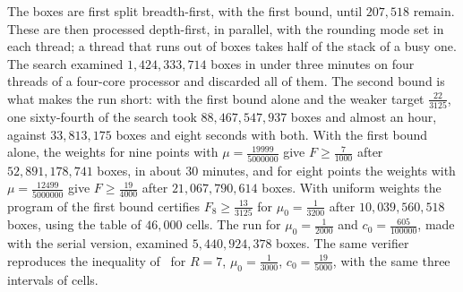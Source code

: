 \documentclass[aps,prd,twocolumn,superscriptaddress,nofootinbib,longbibliography,floatfix,showkeys,amsmath,amssymb,10pt]{revtex4-2}
\theoremstyle{definition}
\theoremstyle{remark}
\begin{document}
The boxes are first split breadth-first, with the first bound, until
$207{,}518$ remain. These are then processed depth-first, in parallel, with
the rounding mode set in each thread; a thread that runs out of boxes takes
half of the stack of a busy one. The search examined
$1{,}424{,}333{,}714$ boxes in under three minutes on four threads of a
four-core processor and discarded all of them. The second bound is what
makes the run short: with the first bound alone and the weaker target
$\frac{22}{3125}$, one sixty-fourth of the search took
$88{,}467{,}547{,}937$ boxes and almost an hour, against
$33{,}813{,}175$ boxes and eight seconds with both. With the first bound
alone, the weights for nine points with
$\mu=\frac{19999}{5000000}$ give $F\ge\frac7{1000}$ after
$52{,}891{,}178{,}741$ boxes, in about 30 minutes, and for eight points the
weights with $\mu=\frac{12499}{5000000}$ give $F\ge\frac{19}{4000}$ after
$21{,}067{,}790{,}614$ boxes. With uniform
weights the program of the first bound
certifies $F_8\ge\frac{13}{3125}$ for $\mu_0=\frac1{3200}$ after
$10{,}039{,}560{,}518$ boxes, using the table of $46{,}000$ cells. The run for
$\mu_0=\frac1{2000}$ and $c_0=\frac{605}{100000}$, made with the serial
version, examined $5{,}440{,}924{,}378$ boxes. The same verifier reproduces
the inequality of~\cite{Ain26} for $R=7$, $\mu_0=\frac1{3000}$,
$c_0=\frac{19}{5000}$, with the same three intervals of cells.
\end{document}
